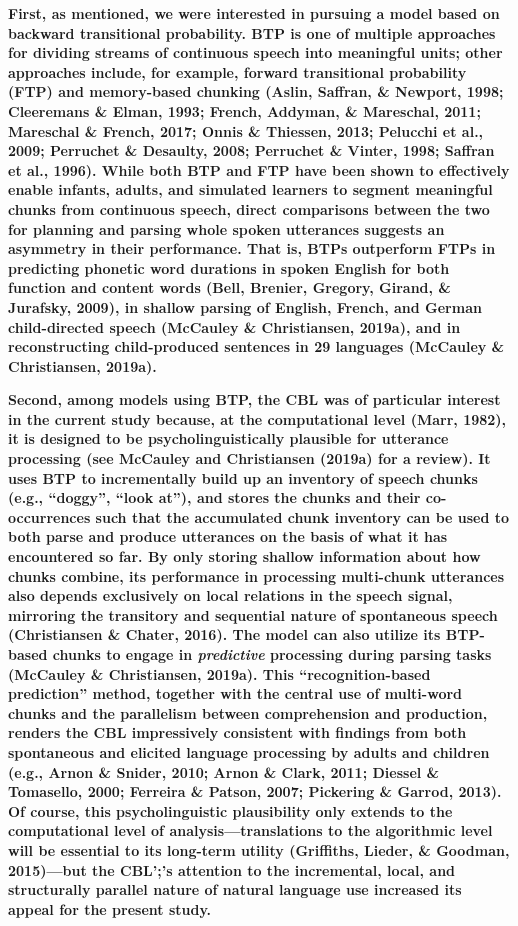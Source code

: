\documentclass[
  english,
  man,mask,floatsintext]{apa6}
\begin{document}
\textbf{First, as mentioned, we were interested in pursuing a model based on backward transitional probability. BTP is one of multiple approaches for dividing streams of continuous speech into meaningful units; other approaches include, for example, forward transitional probability (FTP) and memory-based chunking (Aslin, Saffran, \& Newport, 1998; Cleeremans \& Elman, 1993; French, Addyman, \& Mareschal, 2011; Mareschal \& French, 2017; Onnis \& Thiessen, 2013; Pelucchi et al., 2009; Perruchet \& Desaulty, 2008; Perruchet \& Vinter, 1998; Saffran et al., 1996). While both BTP and FTP have been shown to effectively enable infants, adults, and simulated learners to segment meaningful chunks from continuous speech, direct comparisons between the two for planning and parsing whole spoken utterances suggests an asymmetry in their performance. That is, BTPs outperform FTPs in predicting phonetic word durations in spoken English for both function and content words (Bell, Brenier, Gregory, Girand, \& Jurafsky, 2009), in shallow parsing of English, French, and German child-directed speech (McCauley \& Christiansen, 2019a), and in reconstructing child-produced sentences in 29 languages (McCauley \& Christiansen, 2019a).}

\textbf{Second, among models using BTP, the CBL was of particular interest in the current study because, at the computational level (Marr, 1982), it is designed to be psycholinguistically plausible for utterance processing (see McCauley and Christiansen (2019a) for a review). It uses BTP to incrementally build up an inventory of speech chunks (e.g., \enquote{doggy}, \enquote{look at}), and stores the chunks and their co-occurrences such that the accumulated chunk inventory can be used to both parse and produce utterances on the basis of what it has encountered so far. By only storing shallow information about how chunks combine, its performance in processing multi-chunk utterances also depends exclusively on local relations in the speech signal, mirroring the transitory and sequential nature of spontaneous speech (Christiansen \& Chater, 2016). The model can also utilize its BTP-based chunks to engage in \emph{predictive} processing during parsing tasks (McCauley \& Christiansen, 2019a). This \enquote{recognition-based prediction} method, together with the central use of multi-word chunks and the parallelism between comprehension and production, renders the CBL impressively consistent with findings from both spontaneous and elicited language processing by adults and children (e.g., Arnon \& Snider, 2010; Arnon \& Clark, 2011; Diessel \& Tomasello, 2000; Ferreira \& Patson, 2007; Pickering \& Garrod, 2013). Of course, this psycholinguistic plausibility only extends to the computational level of analysis---translations to the algorithmic level will be essential to its long-term utility (Griffiths, Lieder, \& Goodman, 2015)---but the CBL';'s attention to the incremental, local, and structurally parallel nature of natural language use increased its appeal for the present study.}
\end{document}
